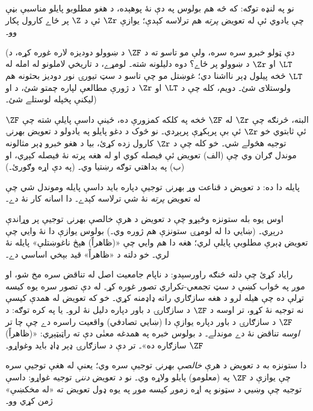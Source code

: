 \documentclass[../../../include/open-logic-section]{subfiles}
\begin{document}
نو په لنډه توګه: که څه هم بولوس په دې نۀ پوهېده، د هغو مطلوبو پايلو مناسبې بڼې چې يادوي ئې له تعويض
\emph{پرته} هم ترلاسه کېدې؛ يوازې $\Zr$ ئې د $\Z$ پر ځاے
کارول پکار وو۔

(دې ټولو خبرو سره سره، ولې مو تاسو ته د $\ZF$ د ښوولو دوديزه لاره غوره کړه،
د $\LT$ او $\Zr$ د ښوولو پر ځاے؟ دوه دليلونه شته۔ لومړے، د
تاريخي لاملونو له امله له $\LT$ څخه پيلول ډېر نااشنا دي؛ غوښتل مو چې
تاسو د سټ تيورۍ نور دوديز بحثونه هم ولوستلای شئ۔ دويم، کله چې د
$\LT$ او $\Zr$ د ژورې مطالعې لپاره چمتو شئ، د \citealt{Potter2004} او
\citealt{ButtonLT1} ليکنې پخپله لوستلے شئ۔)

البته، څرنګه چې $\Zr$ له $\ZF$ څخه په کلکه کمزورې ده، ځينې
داسې پايلې شته چې $\ZF$ ئې ثابتوي خو $\Zr$ ئې بې پرېکړې پرېږدي۔
نو څوک د دغو پايلو په يادولو د تعويض بهرنۍ توجيه هڅولے شي۔ خو کله
چې د $\Zr$ کارول زده کړئ، بيا د هغو خبرو ډېر مثالونه موندل ګران وي
چې (الف) تعويض ئې فيصله کوي او له هغه پرته نۀ فيصله کېږي، او (ب) په
بداهتي توګه رښتيا وي۔ (په دې اړه \citealt[\S13.2]{Potter2004}
وګورئ۔)

پايله دا ده: د تعويض د قناعت وړ بهرنۍ توجيې دپاره بايد داسې
پايله وموندل شي چې له تعويض \emph{پرته} نۀ شي ترلاسه کېدے۔ دا اسانه
کار نۀ دے۔

اوس يوه بله ستونزه وڅېړو چې د تعويض د هرې خالصې بهرنۍ توجيې
پر وړاندې درېږي۔ (ښايي دا له لومړۍ ستونزې هم ژوره وي۔) بولوس يوازې
دا نۀ وايي چې تعويض ډېرې مطلوبې پايلې لري؛ هغه دا هم وايي چې
«(ظاهراً) هېڅ ناغوښتلې» پايله نۀ لري۔ خو دلته د «ظاهراً» قيد بېخي
اساسي دے۔

راياد کړئ چې دلته څنګه راورسېدو: د ناپام جامعيت اصل له تناقض سره
مخ شو، او موږ په ځواب کښې د سټ تجمعي-تکراري تصور غوره کړ۔ له دې تصور
سره يوه کيسه تړلې ده چې هيله لرو د هغه سازګاري راته ډاډمنه کړي۔ خو
که تعويض له همدې کيسې نه توجيه نۀ کړو، تر اوسه د $\ZF$ د سازګارۍ
د باور دپاره دليل نۀ لرو۔ يا په کره توګه: د $\ZF$ د سازګارۍ د باور دپاره يوازې دا
(ښايي تصادفي) واقعيت راسره دے چې چا تر \emph{اوسه} تناقض نۀ دے موندلے۔ د بولوس خبره
په همدغه معنٰی دې ته راټيټېږي: «(ظاهراً) $\ZF$ سازګاره ده»۔ تر دې
د سازګارۍ ډېر ډاډ بايد وغواړو۔

دا ستونزه به د تعويض د هرې \emph{خالصې} بهرنۍ توجيې سره وي؛
يعنې له هغې توجيې سره چې يوازې د $\ZF$ په (معلومو) پايلو ولاړه وي۔
نو د تعويض \emph{دننۍ} توجيه غواړو: داسې توجيه چې وښيي د سټونو په اړه
زموږ کيسه موږ په يوه ډول تعويض ته «له مخکښې» ژمن کړي وو۔
\end{document}
